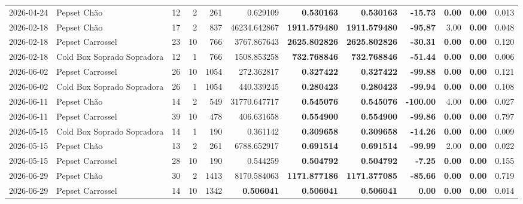 {\begin{center}
{\begin{tabular}{@{}llrrrrrrrrrr@{}}
2026-04-24 & Pepset Chão & 12 & 2 & 261 & 0.629109 & \textbf{0.530163} & \textbf{0.530163} & \textbf{-15.73} & \textbf{0.00} & \textbf{0.00} & 0.013 \\
2026-02-18 & Pepset Chão & 17 & 2 & 837 & 46234.642867 & \textbf{1911.579480} & \textbf{1911.579480} & \textbf{-95.87} & 3.00 & \textbf{0.00} & 0.048 \\
2026-02-18 & Pepset Carrossel & 23 & 10 & 766 & 3767.867643 & \textbf{2625.802826} & \textbf{2625.802826} & \textbf{-30.31} & \textbf{0.00} & \textbf{0.00} & 0.120 \\
2026-02-18 & Cold Box Soprado Sopradora & 12 & 1 & 766 & 1508.853258 & \textbf{732.768846} & \textbf{732.768846} & \textbf{-51.44} & \textbf{0.00} & \textbf{0.00} & 0.006 \\
2026-06-02 & Pepset Carrossel & 26 & 10 & 1054 & 272.362817 & \textbf{0.327422} & \textbf{0.327422} & \textbf{-99.88} & \textbf{0.00} & \textbf{0.00} & 0.121 \\
2026-06-02 & Cold Box Soprado Sopradora & 26 & 1 & 1054 & 440.339245 & \textbf{0.280423} & \textbf{0.280423} & \textbf{-99.94} & \textbf{0.00} & \textbf{0.00} & 0.108 \\
2026-06-11 & Pepset Chão & 14 & 2 & 549 & 31770.647717 & \textbf{0.545076} & \textbf{0.545076} & \textbf{-100.00} & 4.00 & \textbf{0.00} & 0.027 \\
2026-06-11 & Pepset Carrossel & 39 & 10 & 478 & 406.631658 & \textbf{0.554900} & \textbf{0.554900} & \textbf{-99.86} & \textbf{0.00} & \textbf{0.00} & 0.797 \\
2026-05-15 & Cold Box Soprado Sopradora & 14 & 1 & 190 & 0.361142 & \textbf{0.309658} & \textbf{0.309658} & \textbf{-14.26} & \textbf{0.00} & \textbf{0.00} & 0.009 \\
2026-05-15 & Pepset Chão & 13 & 2 & 261 & 6788.652917 & \textbf{0.691514} & \textbf{0.691514} & \textbf{-99.99} & 2.00 & \textbf{0.00} & 0.022 \\
2026-05-15 & Pepset Carrossel & 28 & 10 & 190 & 0.544259 & \textbf{0.504792} & \textbf{0.504792} & \textbf{-7.25} & \textbf{0.00} & \textbf{0.00} & 0.155 \\
2026-06-29 & Pepset Chão & 30 & 2 & 1413 & 8170.584063 & \textbf{1171.877186} & \textbf{1171.377085} & \textbf{-85.66} & \textbf{0.00} & \textbf{0.00} & 0.719 \\
2026-06-29 & Pepset Carrossel & 14 & 10 & 1342 & \textbf{0.506041} & \textbf{0.506041} & \textbf{0.506041} & \textbf{0.00} & \textbf{0.00} & \textbf{0.00} & 0.014 \\

\end{tabular}}
\end{center}}
